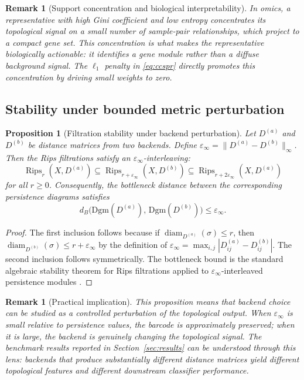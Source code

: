 \documentclass[11pt]{article}
\newtheorem{proposition}[theorem]{Proposition}
\newtheorem{remark}[theorem]{Remark}
\DeclareMathOperator{\Rips}{Rips}
\DeclareMathOperator{\diam}{diam}
\begin{document}
\begin{remark}[Support concentration and biological interpretability]\label{rem:concentration}
In omics, a representative with high Gini coefficient and low entropy concentrates its topological signal on a small number of sample-pair relationships, which project to a compact gene set.
This concentration is what makes the representative biologically actionable: it identifies a gene module rather than a diffuse background signal.
The $\ell_1$ penalty in \eqref{eq:ccspr} directly promotes this concentration by driving small weights to zero.
\end{remark}

\subsection{Stability under bounded metric perturbation}

\begin{proposition}[Filtration stability under backend perturbation]\label{prop:stability}
Let $D^{(a)}$ and $D^{(b)}$ be distance matrices from two backends.
Define $\varepsilon_\infty = \|D^{(a)} - D^{(b)}\|_\infty$.
Then the Rips filtrations satisfy an $\varepsilon_\infty$-interleaving:
\[
\Rips_r(X, D^{(a)}) \subseteq \Rips_{r + \varepsilon_\infty}(X, D^{(b)}) \subseteq \Rips_{r + 2\varepsilon_\infty}(X, D^{(a)})
\]
for all $r \ge 0$.
Consequently, the bottleneck distance between the corresponding persistence diagrams satisfies
\[
d_B\bigl(\mathrm{Dgm}(D^{(a)}),\, \mathrm{Dgm}(D^{(b)})\bigr) \le \varepsilon_\infty.
\]
\end{proposition}

\begin{proof}
The first inclusion follows because if $\diam_{D^{(a)}}(\sigma) \le r$, then $\diam_{D^{(b)}}(\sigma) \le r + \varepsilon_\infty$ by the definition of $\varepsilon_\infty = \max_{i,j} |D^{(a)}_{ij} - D^{(b)}_{ij}|$.
The second inclusion follows symmetrically.
The bottleneck bound is the standard algebraic stability theorem for Rips filtrations applied to $\varepsilon_\infty$-interleaved persistence modules \cite{chazal2014persistence}.
\end{proof}

\begin{remark}[Practical implication]\label{rem:perturbation}
This proposition means that backend choice can be studied as a \emph{controlled perturbation} of the topological output.
When $\varepsilon_\infty$ is small relative to persistence values, the barcode is approximately preserved; when it is large, the backend is genuinely changing the topological signal.
The benchmark results reported in Section~\ref{sec:results} can be understood through this lens: backends that produce substantially different distance matrices yield different topological features and different downstream classifier performance.
\end{remark}
\end{document}
